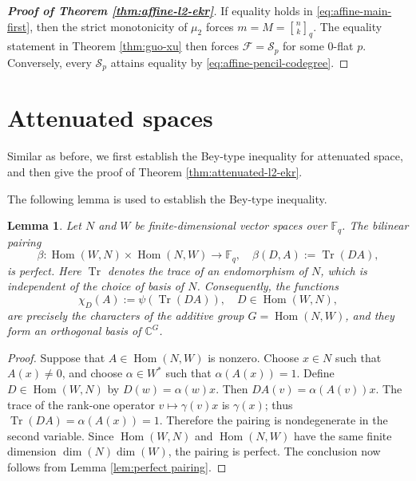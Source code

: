 \documentclass[11pt]{article}
\newtheorem{lemma}{Lemma}
\theoremstyle{definition}
\newcommand{\qbinom}[2]{\genfrac{[}{]}{0pt}{}{#1}{#2}_q}
\newcommand{\Hom}{\operatorname{Hom}}
\newcommand{\Tr}{\operatorname{Tr}}
\begin{document}
\begin{proof}[\bfseries{Proof of Theorem \ref{thm:affine-l2-ekr}}]
If equality holds in \eqref{eq:affine-main-first}, then the strict monotonicity of $\mu_2$ forces $m=M=\qbinom{n}{k}$.  The equality statement in Theorem \ref{thm:guo-xu} then forces $\mathcal F=\mathcal S_p$ for some $0$-flat $p$.  Conversely, every $\mathcal S_p$ attains equality by \eqref{eq:affine-pencil-codegree}.
\end{proof}

\section{Attenuated spaces}
Similar as before, we first establish the Bey-type inequality for attenuated space, and then give the proof of Theorem \ref{thm:attenuated-l2-ekr}.


The following lemma is used to establish the Bey-type inequality.
\begin{lemma}\label{lem: trace pairing}
Let $N$ and $W$ be finite-dimensional vector spaces over $\mathbb{F}_q$. The bilinear pairing
\[
\beta : \Hom(W, N) \times \Hom(N, W) \to \mathbb{F}_q, \quad \beta(D, A) := \Tr(DA),
\]
is perfect. Here $\Tr$ denotes the trace of an endomorphism of $N$, which is independent of the choice of basis of $N$. Consequently, the functions
\[
\chi_D(A) := \psi(\Tr(DA)), \quad D \in \Hom(W, N), 
\]
are precisely the characters of the additive group $G = \Hom(N, W)$,
and they form an orthogonal basis of $\mathbb{C}^G$.    
\end{lemma}
\begin{proof}
Suppose that $A\in\Hom(N,W)$ is nonzero. Choose $x \in N$ such that $A(x) \neq 0$, and choose $\alpha \in W^*$ such that $\alpha(A(x)) = 1$. Define $D\in\Hom(W,N)$ by $D(w)=\alpha(w)x$. Then $DA(v) = \alpha(A(v))x$. The trace of the rank-one operator $v \mapsto \gamma(v)x$ is $\gamma(x)$; thus $\Tr(DA) = \alpha(A(x)) = 1$. Therefore the pairing is nondegenerate in the second variable. Since $\Hom(W, N)$ and $\Hom(N, W)$ have the same finite dimension $\dim(N)\dim(W)$, the pairing is perfect. The conclusion now follows from Lemma \ref{lem:perfect pairing}. 
\end{proof}
\end{document}
